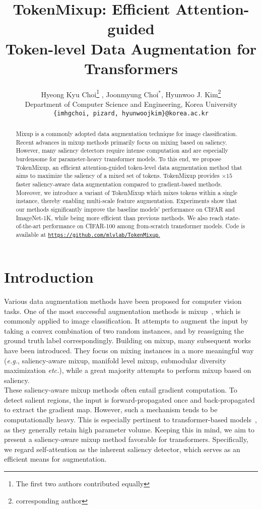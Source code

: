 \documentclass{article}
\title{TokenMixup: Efficient Attention-guided \\ Token-level Data Augmentation for Transformers}
\author{Hyeong Kyu Choi\thanks{The first two authors contributed equally}
  \hspace{0.6mm},
  \hspace{1mm}
  Joonmyung Choi$^*$,
  \hspace{0.5mm} Hyunwoo J. Kim\thanks{corresponding author} \\
  Department of Computer Science and Engineering, Korea University\\
  \texttt{\{imhgchoi, pizard, hyunwoojkim\}@korea.ac.kr} \\
}
\begin{document}
\maketitle





\begin{abstract}
    Mixup is a commonly adopted data augmentation technique for image classification.
    Recent advances in mixup methods primarily focus on mixing based on saliency.
    However, many saliency detectors require intense computation and are especially burdensome for parameter-heavy transformer models.
    To this end, we propose TokenMixup, an efficient attention-guided token-level data augmentation method that aims to maximize the saliency of a mixed set of tokens. TokenMixup provides $\times15$ faster saliency-aware data augmentation compared to gradient-based methods.
    Moreover, we introduce a variant of TokenMixup which mixes tokens within a single instance, thereby enabling multi-scale feature augmentation.
    Experiments show that our methods significantly improve the baseline models' performance on CIFAR and ImageNet-1K, while being more efficient than previous methods.
    We also reach state-of-the-art performance on CIFAR-100 among from-scratch transformer models.
    Code is available at \href{https://github.com/mlvlab/TokenMixup}{\texttt{https://github.com/mlvlab/TokenMixup}.}
\end{abstract} \section{Introduction}
\label{section:introduction}

Various data augmentation methods have been proposed for computer vision tasks.
One of the most successful augmentation methods is mixup~\cite{zhang2017mixup}, which is commonly applied to image classification.
It attempts to augment the input by taking a convex combination of two random instances, and by reassigning the ground truth label correspondingly.
Building on mixup, many subsequent works~\cite{yun2019cutmix, kim2020puzzle, kim2021co, uddin2020saliencymix,verma2019manifold, venkataramanan2021alignmix, hong2021stylemix, dabouei2021supermix} have been introduced.
They focus on mixing instances in a more meaningful way (\textit{e.g.}, saliency-aware mixup, manifold level mixup, submodular diversity maximization \textit{etc.}), while a great majority attempts to perform mixup based on saliency.\\
These saliency-aware mixup methods often entail gradient computation.
To detect salient regions, the input is forward-propagated once and back-propagated to extract the gradient map.
However, such a mechanism tends to be computationally heavy. 
This is especially pertinent to transformer-based models~\cite{vaswani2017attention}, as they generally retain high parameter volume.
Keeping this in mind, we aim to present a saliency-aware mixup method favorable for transformers.
Specifically, we regard self-attention as the inherent saliency detector, which serves as an efficient means for augmentation.
\end{document}
